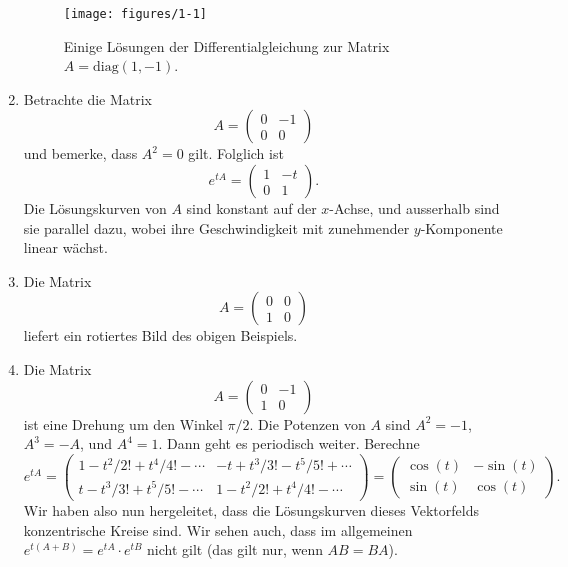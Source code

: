 \documentclass[../main.tex]{subfiles}
\begin{document}
\begin{examples}
\begin{enumerate}[(1)]
      \begin{figure}[htb]
        \centering
        \texttt{[image: figures/1-1]}
        \caption{Einige Lösungen der Differentialgleichung
        zur Matrix $A = \text{diag}(1, -1)$.}%
        \label{fig:1-1}
      \end{figure}
    \item Betrachte die Matrix
      \[
          A =
          \begin{pmatrix}
            0 & -1 \\ 0 & 0
          \end{pmatrix}
      \]
      und bemerke, dass $A^2 = 0$ gilt.
      Folglich ist
      \[
        e^{tA} =
        \begin{pmatrix}
          1 & -t \\ 0 & 1
        \end{pmatrix}.
      \]
      Die Lösungskurven von $A$ 
      sind konstant auf der $x$-Achse,
      und ausserhalb sind sie parallel dazu,
      wobei ihre Geschwindigkeit mit zunehmender
      $y$-Komponente linear wächst.
    \item Die Matrix
      \[
        A = 
        \begin{pmatrix}
          0 & 0 \\ 1 & 0
        \end{pmatrix}
      \]
      liefert ein rotiertes Bild des obigen Beispiels.
    \item Die Matrix
      \[
        A =
        \begin{pmatrix}
          0 & -1 \\ 1 & 0
        \end{pmatrix}
      \]
      ist eine Drehung um den Winkel $\pi/2$.
      Die Potenzen von $A$ sind
      $A^2 = -1$, $A^3 = -A$, und $A^4 = 1$.
      Dann geht es periodisch weiter.
      Berechne
      \[
        e^{tA} =
        \begin{pmatrix}
          1 - t^2/2! + t^4/4! -  \cdots
          & -t + t^3/3! - t^5/5! + \cdots \\
          t - t^3/3! + t^5/5! - \cdots
          &
          1 - t^2/2! + t^4/4! -  \cdots
        \end{pmatrix}
        =
        \begin{pmatrix}
          \cos(t) & -\sin(t) \\
          \sin(t) & \cos(t)
        \end{pmatrix}.
      \]
      Wir haben also nun hergeleitet, dass
      die Lösungskurven dieses Vektorfelds konzentrische
      Kreise sind.
      Wir sehen auch, dass im allgemeinen
      $e^{t(A + B)} = e^{tA} \cdot e^{tB}$ nicht gilt
      (das gilt nur, wenn $AB = BA$).
  \end{enumerate}
\end{examples}
\end{document}
